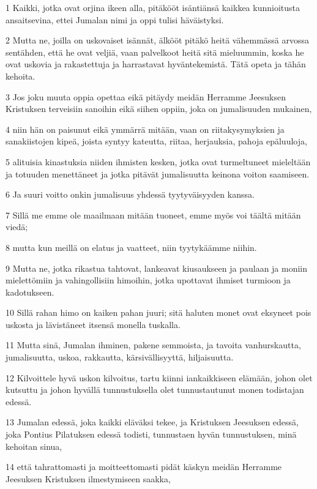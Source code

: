 \par 1 Kaikki, jotka ovat orjina ikeen alla, pitäkööt isäntiänsä kaikkea kunnioitusta ansaitsevina, ettei Jumalan nimi ja oppi tulisi häväistyksi.
\par 2 Mutta ne, joilla on uskovaiset isännät, älkööt pitäkö heitä vähemmässä arvossa sentähden, että he ovat veljiä, vaan palvelkoot heitä sitä mieluummin, koska he ovat uskovia ja rakastettuja ja harrastavat hyväntekemistä. Tätä opeta ja tähän kehoita.
\par 3 Jos joku muuta oppia opettaa eikä pitäydy meidän Herramme Jeesuksen Kristuksen terveisiin sanoihin eikä siihen oppiin, joka on jumalisuuden mukainen,
\par 4 niin hän on paisunut eikä ymmärrä mitään, vaan on riitakysymyksien ja sanakiistojen kipeä, joista syntyy kateutta, riitaa, herjauksia, pahoja epäluuloja,
\par 5 alituisia kinastuksia niiden ihmisten kesken, jotka ovat turmeltuneet mieleltään ja totuuden menettäneet ja jotka pitävät jumalisuutta keinona voiton saamiseen.
\par 6 Ja suuri voitto onkin jumalisuus yhdessä tyytyväisyyden kanssa.
\par 7 Sillä me emme ole maailmaan mitään tuoneet, emme myös voi täältä mitään viedä;
\par 8 mutta kun meillä on elatus ja vaatteet, niin tyytykäämme niihin.
\par 9 Mutta ne, jotka rikastua tahtovat, lankeavat kiusaukseen ja paulaan ja moniin mielettömiin ja vahingollisiin himoihin, jotka upottavat ihmiset turmioon ja kadotukseen.
\par 10 Sillä rahan himo on kaiken pahan juuri; sitä haluten monet ovat eksyneet pois uskosta ja lävistäneet itsensä monella tuskalla.
\par 11 Mutta sinä, Jumalan ihminen, pakene semmoista, ja tavoita vanhurskautta, jumalisuutta, uskoa, rakkautta, kärsivällisyyttä, hiljaisuutta.
\par 12 Kilvoittele hyvä uskon kilvoitus, tartu kiinni iankaikkiseen elämään, johon olet kutsuttu ja johon hyvällä tunnustuksella olet tunnustautunut monen todistajan edessä.
\par 13 Jumalan edessä, joka kaikki eläväksi tekee, ja Kristuksen Jeesuksen edessä, joka Pontius Pilatuksen edessä todisti, tunnustaen hyvän tunnustuksen, minä kehoitan sinua,
\par 14 että tahrattomasti ja moitteettomasti pidät käskyn meidän Herramme Jeesuksen Kristuksen ilmestymiseen saakka,
